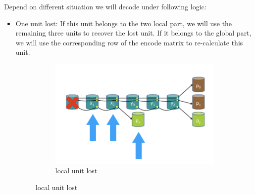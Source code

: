 \documentclass[10pt]{article}
\begin{document}
\begin{itemize}
Depend on different situation we will decode under following logic:
\begin{itemize}
\item One unit lost: If this unit belongs to the two local part, we will use the remaining three units to recover the lost unit. If it belongs to the global part, we will use the corresponding row of the encode matrix to re-calculate this unit.
\begin{figure}[H]
    \centering
    \begin{subfigure}[b]{0.5\textwidth}
        \includegraphics[width=\textwidth]{LRC-2.png}
        \caption{local unit lost}
    \end{subfigure}
    

\end{figure}
\end{itemize}
\end{itemize}
\end{document}
